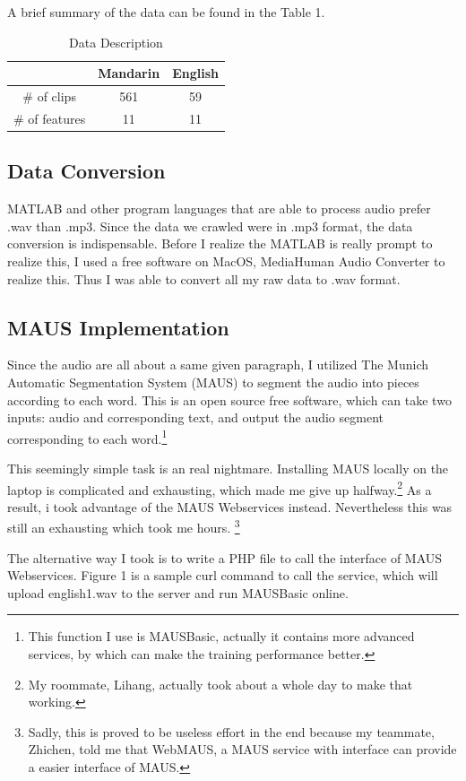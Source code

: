 \documentclass{sig-alternate}
\begin{document}
A brief summary of the data can be found in the Table 1.

\begin{table}[ht]
\centering
\caption{Data Description}
\begin{tabular}{|c|c|c|} \hline
&Mandarin&English\\ \hline
\# of clips&561 &59 \\ \hline
\# of features&11 &11 \\ \hline

\end{tabular}
\end{table}

\subsection{Data Conversion}
MATLAB and other program languages that are able to process audio prefer .wav than .mp3. Since the data we crawled were in .mp3 format, the data conversion is indispensable. Before I realize the MATLAB is really prompt to realize this, I used a free software on MacOS, MediaHuman Audio Converter\cite{convert} to realize this. Thus I was able to convert all my raw data to .wav format.


\subsection{MAUS Implementation}
Since the audio are all about a same given paragraph, I utilized The Munich Automatic Segmentation System (MAUS)\cite{maus} to segment the audio into pieces according to each word. This is an open source free software, which can take two inputs: audio and corresponding text, and output the audio segment corresponding to each word.\footnote{This function I use is MAUSBasic, actually it contains more advanced services, by which can make the training performance better.}

This seemingly simple task is an real nightmare. Installing MAUS locally on the laptop is complicated and exhausting, which made me give up halfway.\footnote{My roommate, Lihang, actually took about a whole day to make that working.} As a result, i took advantage of the MAUS Webservices instead. Nevertheless this was still an exhausting which took me hours. \footnote{Sadly, this is proved to be useless effort in the end because my teammate, Zhichen, told me that WebMAUS, a MAUS service with interface can provide a easier interface of MAUS.}

The alternative way I took is to write a PHP file to call the interface of MAUS Webservices. Figure 1 is a sample curl command to call the service, which will upload english1.wav to the server and run MAUSBasic online.
\end{document}
